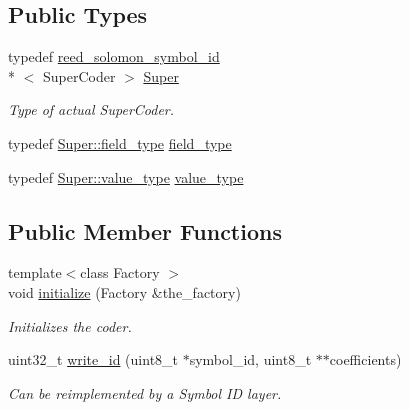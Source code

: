 \subsection*{Public Types}
\begin{DoxyCompactItemize}
\item 
\hypertarget{classkodo_1_1reed__solomon__symbol__id__writer_a42074595077d3079d0f9d210c4879b54}{typedef \hyperlink{classkodo_1_1reed__solomon__symbol__id}{reed\-\_\-solomon\-\_\-symbol\-\_\-id}\\*
$<$ Super\-Coder $>$ \hyperlink{classkodo_1_1reed__solomon__symbol__id__writer_a42074595077d3079d0f9d210c4879b54}{Super}}\label{classkodo_1_1reed__solomon__symbol__id__writer_a42074595077d3079d0f9d210c4879b54}

\begin{DoxyCompactList}\small\item\em Type of actual Super\-Coder. \end{DoxyCompactList}\item 
typedef \hyperlink{classkodo_1_1reed__solomon__symbol__id_a4743bd9dd076991ad2bf882b13293d40}{Super\-::field\-\_\-type} \hyperlink{classkodo_1_1reed__solomon__symbol__id__writer_ac87679f574c25276e40aec8fe4b941a3}{field\-\_\-type}
\begin{DoxyCompactList}\small\item\em \end{DoxyCompactList}\item 
typedef \hyperlink{classkodo_1_1reed__solomon__symbol__id_a86e8c6d7a02eaf6dbd2edde56e4cddad}{Super\-::value\-\_\-type} \hyperlink{classkodo_1_1reed__solomon__symbol__id__writer_ad37b24364f156ca0cca7dcf41d1cbeb1}{value\-\_\-type}
\begin{DoxyCompactList}\small\item\em \end{DoxyCompactList}\end{DoxyCompactItemize}
\subsection*{Public Member Functions}
\begin{DoxyCompactItemize}
\item 
{\footnotesize template$<$class Factory $>$ }\\void \hyperlink{classkodo_1_1reed__solomon__symbol__id__writer_a513405919c024d31e94491ae45daa723}{initialize} (Factory \&the\-\_\-factory)
\begin{DoxyCompactList}\small\item\em Initializes the coder. \end{DoxyCompactList}\item 
uint32\-\_\-t \hyperlink{classkodo_1_1reed__solomon__symbol__id__writer_a144f1133418b6c55404bcd0173641003}{write\-\_\-id} (uint8\-\_\-t $\ast$symbol\-\_\-id, uint8\-\_\-t $\ast$$\ast$coefficients)
\begin{DoxyCompactList}\small\item\em Can be reimplemented by a Symbol I\-D layer. \end{DoxyCompactList}\end{DoxyCompactItemize}
